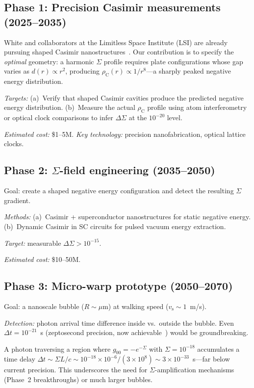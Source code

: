 \documentclass[prd,twocolumn,superscriptaddress,longbibliography]{revtex4-2}
\newcommand{\vs}{v_{\mathrm{s}}}
\begin{document}
\subsection{Phase 1: Precision Casimir measurements (2025--2035)}

White and collaborators at the Limitless Space Institute (LSI) are
already pursuing shaped Casimir nanostructures~\cite{White2021}.
Our contribution is to specify the \emph{optimal} geometry: a
harmonic $\Sigma$ profile requires plate configurations whose
gap varies as $d(r) \propto r^2$, producing
$\rho_{\mathrm{C}}(r) \propto 1/r^8$---a sharply peaked negative
energy distribution.

\textit{Targets:}
(a)~Verify that shaped Casimir cavities produce the predicted
negative energy distribution.
(b)~Measure the actual $\rho_{\mathrm{C}}$ profile using
atom interferometry or optical clock comparisons to
infer $\Delta\Sigma$ at the $10^{-20}$ level.

\textit{Estimated cost:} \$1--5M.  \textit{Key technology:}
precision nanofabrication, optical lattice clocks.

\subsection{Phase 2: $\Sigma$-field engineering (2035--2050)}

Goal: create a shaped negative energy configuration and detect
the resulting $\Sigma$ gradient.

\textit{Methods:}
(a)~Casimir + superconductor nanostructures for static negative
energy.
(b)~Dynamic Casimir in SC circuits for pulsed vacuum energy
extraction.

\textit{Target:} measurable $\Delta\Sigma > 10^{-15}$.

\textit{Estimated cost:} \$10--50M.

\subsection{Phase 3: Micro-warp prototype (2050--2070)}

Goal: a nanoscale bubble ($R \sim \mu$m) at walking speed
($\vs \sim 1$~m/s).

\textit{Detection:} photon arrival time difference inside vs.\
outside the bubble.  Even $\Delta t = 10^{-21}$~s (zeptosecond
precision, now achievable~\cite{Grundmann2020}) would be
groundbreaking.

A photon traversing a region where $g_{00} = -e^{-\Sigma}$ with
$\Sigma = 10^{-18}$ accumulates a time delay
$\Delta t \sim \Sigma L/c \sim 10^{-18}\times 10^{-6}/
(3\times 10^8) \sim 3\times 10^{-33}$~s---far below current
precision.  This underscores the need for $\Sigma$-amplification
mechanisms (Phase~2 breakthroughs) or much larger bubbles.
\end{document}
